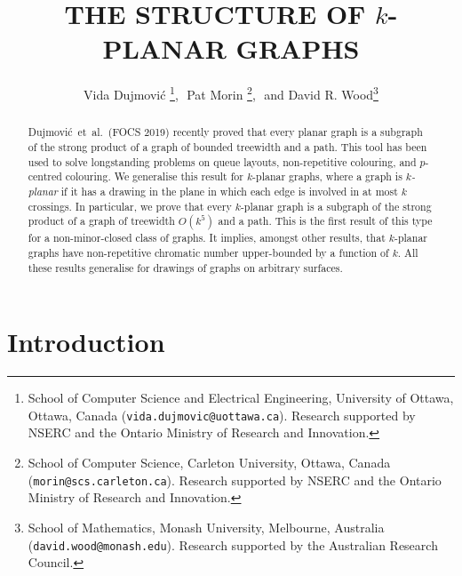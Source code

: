 \documentclass{patmorin}
\title{\MakeUppercase{The Structure of $k$-Planar Graphs}}
\author{Vida Dujmovi\'c%
        \thanks{School of Computer Science and Electrical Engineering,
                University of Ottawa, Ottawa, Canada (\texttt{vida.dujmovic@uottawa.ca}).
                Research  supported by NSERC and the Ontario Ministry of Research and Innovation.},\,\,
        Pat Morin%
        \thanks{School of Computer Science, Carleton University, Ottawa, Canada (\texttt{morin@scs.carleton.ca}).                 Research  supported by NSERC and the Ontario Ministry of Research and Innovation.},\,\, and
        David R. Wood\thanks{School of Mathematics, Monash University, Melbourne, Australia (\texttt{david.wood@monash.edu}). Research supported by the Australian Research Council.}
}
\renewcommand{\ge}{\geqslant}
\begin{document}
\begin{titlepage}
\maketitle

\begin{abstract}
Dujmovi\'c~et~al.~(FOCS 2019) recently proved that every planar graph is a subgraph of the strong product of a graph of bounded treewidth and a path. This tool has been used to solve longstanding problems on queue layouts, non-repetitive colouring, and $p$-centred colouring. %
We generalise this result for $k$-planar graphs, where a graph is \emph{$k$-planar} if it has a drawing in the plane in which each edge is involved in at most $k$ crossings. In particular, we prove that every $k$-planar graph is a subgraph of the strong product of a graph of treewidth $O(k^5)$ and a path. This is the first result of this type for a non-minor-closed class of graphs. It implies, amongst other results, that $k$-planar graphs have non-repetitive chromatic number upper-bounded by a function of $k$. All these results generalise for drawings of graphs on arbitrary surfaces. 
\end{abstract}
\end{titlepage}


\tableofcontents
\newpage
\section{Introduction}
\end{document}
